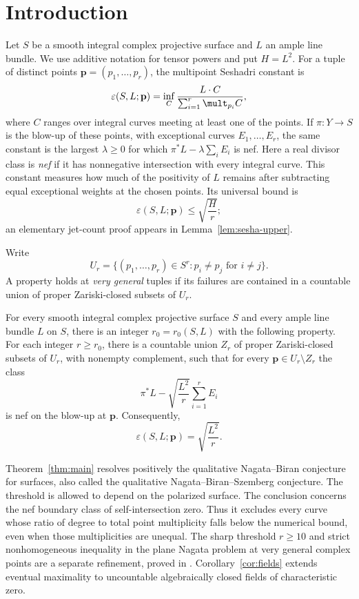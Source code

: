 \section{Introduction}\label{sec:introduction}

Let $S$ be a smooth integral complex projective surface and $L$ an ample
line bundle. We use additive notation for tensor powers and put $H=L^2$.
For a tuple of distinct points $\mathbf p=(p_1,\ldots,p_r)$, the multipoint
Seshadri constant is
\[
 \varepsilon(S,L;\mathbf p)
 =\inf_C\frac{L\cdot C}{\sum_{i=1}^r\mult_{p_i}C},
\]
where $C$ ranges over integral curves meeting at least one of the points.
If $\pi:Y\to S$ is the blow-up of these points, with exceptional curves
$E_1,\ldots,E_r$, the same constant is the largest $\lambda\ge0$ for
which $\pi^*L-\lambda\sum_iE_i$ is nef. Here a real divisor class is
\emph{nef} if it has nonnegative intersection with every integral curve.
This constant measures how much of the positivity of $L$ remains after
subtracting equal exceptional weights at the chosen points. Its universal
bound is
\begin{equation}\label{eq:upper-bound}
 \varepsilon(S,L;\mathbf p)\le\sqrt{\frac Hr};
\end{equation}
an elementary jet-count proof appears in Lemma~\ref{lem:sesha-upper}.

Write
\[
 U_r=\{(p_1,\ldots,p_r)\in S^r:p_i\ne p_j\text{ for }i\ne j\}.
\]
A property holds at \emph{very general} tuples if its failures are contained
in a countable union of proper Zariski-closed subsets of $U_r$.

\begin{theorem}\label{thm:main}
For every smooth integral complex projective surface $S$ and every ample
line bundle $L$ on $S$, there is an integer $r_0=r_0(S,L)$ with the following
property. For each integer $r\ge r_0$, there is a countable union
$Z_r$ of proper Zariski-closed subsets of $U_r$, with nonempty complement,
such that for every $\mathbf p\in U_r\setminus Z_r$ the class
\[
 \pi^*L-\sqrt{\frac{L^2}{r}}\sum_{i=1}^r E_i
\]
is nef on the blow-up at $\mathbf p$. Consequently,
\[
 \varepsilon(S,L;\mathbf p)=\sqrt{\frac{L^2}{r}}.
\]
\end{theorem}

Theorem~\ref{thm:main} resolves positively the qualitative Nagata--Biran
conjecture for surfaces, also called the qualitative
Nagata--Biran--Szemberg conjecture. The threshold is allowed to depend on
the polarized surface. The conclusion concerns the nef boundary class of
self-intersection zero. Thus it excludes every curve whose ratio of degree
to total point multiplicity falls below the numerical bound, even when
those multiplicities are unequal. The sharp threshold $r\ge10$ and strict nonhomogeneous
inequality in the plane Nagata problem at very general complex points
are a separate refinement, proved in
\cite[Theorem~1.1]{OpenAINagata2026}.
Corollary~\ref{cor:fields} extends eventual maximality to uncountable
algebraically closed fields of characteristic zero.


